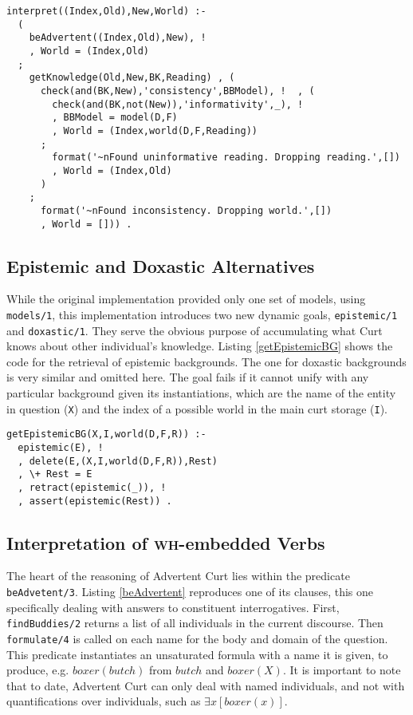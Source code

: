 \documentclass[notitlepage,twoside,a4paper]{scrreprt}
\newcommand{\code}[1]{\texttt{#1}} %
\newcommand{\pn}{\textsf} %
\newcommand{\wh}{\textsc{wh}}
\newcommand{\curt}{\pn{Curt}}
\newcommand{\acurt}{\pn{Advertent Curt}}
\theoremstyle{remark}
\theoremstyle{remark}
\theoremstyle{definition}
\theoremstyle{definition}
\begin{document}
\begin{lstlisting}[label=interpret,caption={The interpretation code for one
  particular world and reading},float]
interpret((Index,Old),New,World) :-
  (
    beAdvertent((Index,Old),New), !
    , World = (Index,Old)
  ;
    getKnowledge(Old,New,BK,Reading) , (
      check(and(BK,New),'consistency',BBModel), !  , (
        check(and(BK,not(New)),'informativity',_), !
        , BBModel = model(D,F)
        , World = (Index,world(D,F,Reading))
      ;
        format('~nFound uninformative reading. Dropping reading.',[])
        , World = (Index,Old)
      )
    ;
      format('~nFound inconsistency. Dropping world.',[])
      , World = [])) .
\end{lstlisting}

\subsection{Epistemic and Doxastic Alternatives}\label{sec:inference}

While the original
implementation provided only one set of models, using \lstinline!models/1!, this
implementation introduces two
new dynamic goals, \lstinline!epistemic/1! and \lstinline!doxastic/1!. They
serve the obvious purpose of accumulating what \curt{} knows about other
individual's knowledge. Listing \ref{getEpistemicBG} shows the code for the
retrieval of epistemic backgrounds. The one for doxastic backgrounds is very
similar and omitted here. The goal fails if it cannot unify with any particular
background given its instantiations, which are the name of the entity in
question (\code{X}) and the index of a possible world in the main curt storage
(\code{I}).

\begin{lstlisting}[label=getEpistemicBG,caption={A Predicate to Retrieve Epistemic
  Backgrounds},float]
getEpistemicBG(X,I,world(D,F,R)) :-
  epistemic(E), !
  , delete(E,(X,I,world(D,F,R)),Rest)
  , \+ Rest = E
  , retract(epistemic(_)), !
  , assert(epistemic(Rest)) .
\end{lstlisting}

\subsection{Interpretation of \wh-embedded Verbs}

The heart of the reasoning of \acurt{} lies within the predicate
\code{beAdvetent/3}. Listing \ref{beAdvertent} reproduces one of its clauses,
this one specifically dealing with answers to constituent interrogatives. First,
\code{findBuddies/2} returns a list of all individuals in the current discourse.
Then \code{formulate/4} is called on each name for the body and domain of the
question. This predicate instantiates an unsaturated formula with a name it is
given, to produce, e.g. $boxer(butch)$ from $butch$ and $boxer(X)$. It is
important to note that to date, \acurt{} can only deal with named individuals,
and not with quantifications over individuals, such as $\exists x[boxer(x)]$.
\end{document}
